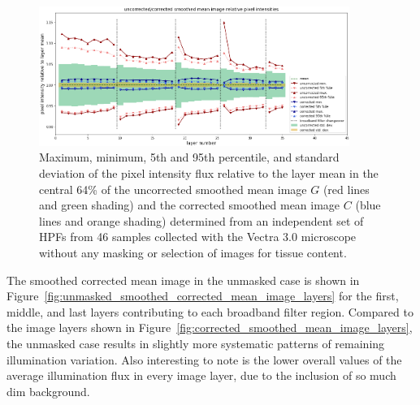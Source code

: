 \documentclass[letterpaper,11pt]{article}
\newcommand{\reffig}[1]{Figure~\ref{#1}}
\begin{document}
\begin{figure}[!ht]
\centering
\includegraphics[width=0.90\textwidth]{images/results/unmasked_flatfield_illumination_variation_reduction}
\caption{\footnotesize Maximum, minimum, 5th and 95th percentile, and standard deviation of the pixel intensity flux relative to the layer mean in the central 64\% of the uncorrected smoothed mean image $G$ (red lines and green shading) and the corrected smoothed mean image $C$ (blue lines and orange shading) determined from an independent set of HPFs from 46 samples collected with the Vectra 3.0 microscope without any masking or selection of images for tissue content.}
\label{fig:unmasked_illumination_variation_reduction}
\end{figure} 

The smoothed corrected mean image in the unmasked case is shown in \reffig{fig:unmasked_smoothed_corrected_mean_image_layers} for the first, middle, and last layers contributing to each broadband filter region. Compared to the image layers shown in \reffig{fig:corrected_smoothed_mean_image_layers}, the unmasked case results in slightly more systematic patterns of remaining illumination variation. Also interesting to note is the lower overall values of the average illumination flux in every image layer, due to the inclusion of so much dim background.
\end{document}
